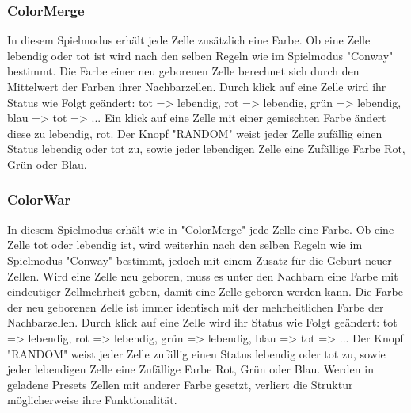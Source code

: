 \documentclass[12pt]{article}
\theoremstyle{plain}
\begin{document}
\subsubsection{ColorMerge}
In diesem Spielmodus erhält jede Zelle zusätzlich eine Farbe. Ob eine Zelle lebendig oder tot ist wird nach den selben Regeln wie im Spielmodus "Conway" bestimmt. Die Farbe einer neu geborenen Zelle berechnet sich durch den Mittelwert der Farben ihrer Nachbarzellen. Durch klick auf eine Zelle wird ihr Status wie Folgt geändert:
\newline
tot => lebendig, rot => lebendig, grün => lebendig, blau => tot => ...
\newline
Ein klick auf eine Zelle mit einer gemischten Farbe ändert diese zu lebendig, rot. Der Knopf "RANDOM" weist jeder Zelle zufällig einen Status lebendig oder tot zu, sowie jeder lebendigen Zelle eine Zufällige Farbe Rot, Grün oder Blau.

\subsubsection{ColorWar}
In diesem Spielmodus erhält wie in "ColorMerge" jede Zelle eine Farbe. Ob eine Zelle tot oder lebendig ist, wird weiterhin nach den selben Regeln wie im Spielmodus "Conway" bestimmt, jedoch mit einem Zusatz für die Geburt neuer Zellen. Wird eine Zelle neu geboren, muss es unter den Nachbarn eine Farbe mit eindeutiger Zellmehrheit geben, damit eine Zelle geboren werden kann. Die Farbe der neu geborenen Zelle ist immer identisch mit der mehrheitlichen Farbe der Nachbarzellen.
\newline
Durch klick auf eine Zelle wird ihr Status wie Folgt geändert:
\newline
tot => lebendig, rot => lebendig, grün => lebendig, blau => tot => ...
\newline
Der Knopf "RANDOM" weist jeder Zelle zufällig einen Status lebendig oder tot zu, sowie jeder lebendigen Zelle eine Zufällige Farbe Rot, Grün oder Blau. Werden in geladene Presets Zellen mit anderer Farbe gesetzt, verliert die Struktur möglicherweise ihre Funktionalität.
\end{document}
